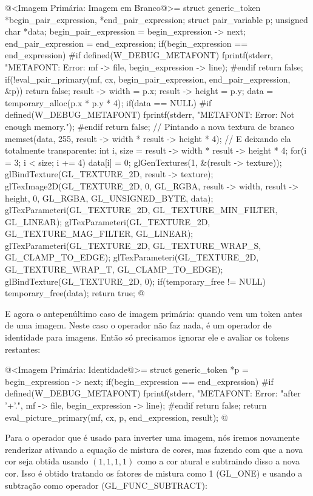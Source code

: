 {\iniciocodigo
@<Imagem Primária: Imagem em Branco@>=
struct generic_token *begin_pair_expression, *end_pair_expression;
struct pair_variable p;
unsigned char *data;
begin_pair_expression = begin_expression -> next;
end_pair_expression = end_expression;
if(begin_expression == end_expression){
#if defined(W_DEBUG_METAFONT)
  fprintf(stderr, "METAFONT: Error: %
          mf -> file, begin_expression -> line);
#endif
  return false;
}
if(!eval_pair_primary(mf, cx, begin_pair_expression, end_pair_expression, &p))
  return false;
result -> width = p.x;
result -> height = p.y;
data = temporary_alloc(p.x * p.y * 4);
if(data == NULL){
#if defined(W_DEBUG_METAFONT)
  fprintf(stderr, "METAFONT: Error: Not enough memory.\n");
#endif
  return false;
}
// Pintando a nova textura de branco
memset(data, 255, result -> width * result -> height * 4);
{ // E deixando ela totalmente transparente:
  int i, size = result -> width * result -> height * 4;
  for(i = 3; i < size; i += 4)
    data[i] = 0;
}
glGenTextures(1, &(result -> texture));
glBindTexture(GL_TEXTURE_2D, result -> texture);
glTexImage2D(GL_TEXTURE_2D, 0, GL_RGBA, result -> width, result -> height, 0,
             GL_RGBA, GL_UNSIGNED_BYTE, data);
glTexParameteri(GL_TEXTURE_2D, GL_TEXTURE_MIN_FILTER, GL_LINEAR);
glTexParameteri(GL_TEXTURE_2D, GL_TEXTURE_MAG_FILTER, GL_LINEAR);
glTexParameteri(GL_TEXTURE_2D, GL_TEXTURE_WRAP_S, GL_CLAMP_TO_EDGE);
glTexParameteri(GL_TEXTURE_2D, GL_TEXTURE_WRAP_T, GL_CLAMP_TO_EDGE);
glBindTexture(GL_TEXTURE_2D, 0);
if(temporary_free != NULL)
  temporary_free(data);
return true;
@
\fimcodigo

E agora o antepenúltimo caso de imagem primária: quando vem um
token \monoespaco{+} antes de uma imagem. Neste caso o operador não faz
nada, é um operador de identidade para imagens. Então só precisamos
ignorar ele e avaliar os tokens restantes:

\iniciocodigo
@<Imagem Primária: Identidade@>=
struct generic_token *p = begin_expression -> next;
if(begin_expression == end_expression){
#if defined(W_DEBUG_METAFONT)
  fprintf(stderr, "METAFONT: Error: %
                  "after '+'.\n", mf -> file, begin_expression -> line);
#endif
  return false;
}
return eval_picture_primary(mf, cx, p, end_expression, result);
@
\fimcodigo

Para o operador \monoespaco{-} que é usado para inverter uma imagem,
nós iremos novamente renderizar ativando a equação de mistura de
cores, mas fazendo com que a nova cor seja obtida usando $(1, 1, 1,
1)$ como a cor atural e subtraindo disso a nova cor. Isso é obtido
tratando os fatores de mistura como 1 (GL\_ONE) e usando a subtração
como operador (GL\_FUNC\_SUBTRACT):


}
